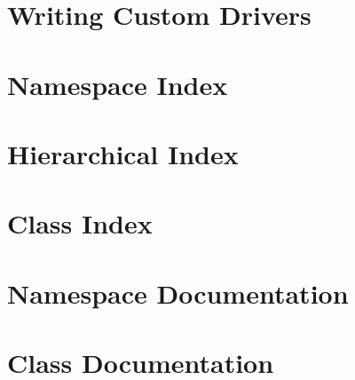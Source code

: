 \documentclass{book}
\begin{document}
\chapter{Writing Custom Drivers}
\label{writing_drivers}
\hypertarget{writing_drivers}{}

\chapter{Namespace Index}

\chapter{Hierarchical Index}

\chapter{Class Index}

\chapter{Namespace Documentation}










\chapter{Class Documentation}



















\printindex
\end{document}
